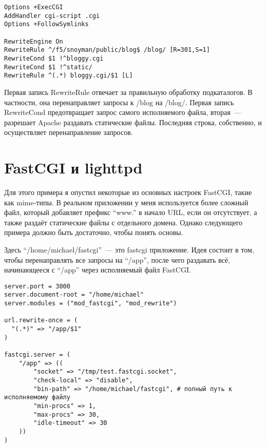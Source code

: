 \begin{lstlisting}
Options +ExecCGI
AddHandler cgi-script .cgi
Options +FollowSymlinks

RewriteEngine On
RewriteRule ^/f5/snoyman/public/blog$ /blog/ [R=301,S=1]
RewriteCond $1 !^bloggy.cgi
RewriteCond $1 !^static/
RewriteRule ^(.*) bloggy.cgi/$1 [L]
\end{lstlisting}
%

Первая запись RewriteRule отвечает за правильную обработку подкаталогов. В частности, она перенаправляет запросы к /blog на /blog/. Первая запись RewriteCond предотвращает запрос самого исполняемого файла, вторая~--- разрешает Apache раздавать статические файлы. Последняя строка, собственно, и осуществляет перенаправление запросов.
%

\section{FastCGI и lighttpd}
%
%

Для этого примера я опустил некоторые из основных настроек FastCGI, такие как mime-типы. В реальном приложении у меня используется более сложный файл, который добавляет префикс ``www.'' в начало URL, если он отсутствует, а также раздаёт статические файлы с отдельного домена. Однако следующего примера должно быть достаточно, чтобы понять основы.

Здесь ``/home/michael/fastcgi''~--- это fastcgi приложение. Идея состоит в том, чтобы перенаправлять все запросы на ``/app'', после чего раздавать всё, начинающееся с ``/app'' через исполняемый файл FastCGI.
%

\begin{lstlisting}
server.port = 3000
server.document-root = "/home/michael"
server.modules = ("mod_fastcgi", "mod_rewrite")

url.rewrite-once = (
  "(.*)" => "/app/$1"
)

fastcgi.server = (
    "/app" => ((
        "socket" => "/tmp/test.fastcgi.socket",
        "check-local" => "disable",
        "bin-path" => "/home/michael/fastcgi", # полный путь к исполняемому файлу
        "min-procs" => 1,
        "max-procs" => 30,
        "idle-timeout" => 30
    ))
)
\end{lstlisting}%

